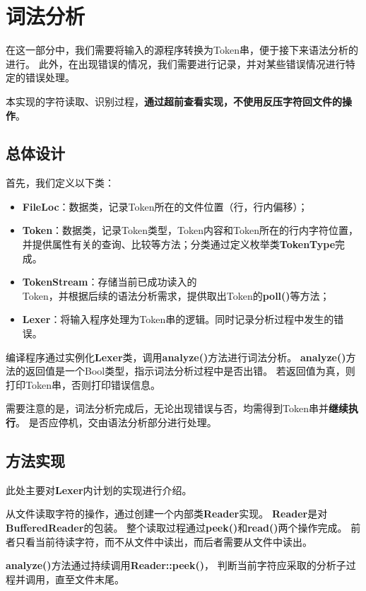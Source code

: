 \section{词法分析}

在这一部分中，我们需要将输入的源程序转换为Token串，便于接下来语法分析的进行。
此外，在出现错误的情况，我们需要进行记录，并对某些错误情况进行特定的错误处理。

本实现的字符读取、识别过程，\textbf{通过超前查看实现，不使用反压字符回文件的操作}。

\subsection{总体设计}

首先，我们定义以下类：
\begin{itemize}
    \item \textbf{FileLoc}：数据类，记录Token所在的文件位置（行，行内偏移）；
    \item \textbf{Token}：数据类，记录Token类型，Token内容和Token所在的行内字符位置，并提供属性有关的查询、比较等方法；分类通过定义枚举类\textbf{TokenType}完成。
    \item \textbf{TokenStream}：存储当前已成功读入的\\Token，并根据后续的语法分析需求，提供取出Token的\textbf{poll()}等方法；
    \item \textbf{Lexer}：将输入程序处理为Token串的逻辑。同时记录分析过程中发生的错误。
\end{itemize}

编译程序通过实例化\textbf{Lexer}类，调用\textbf{analyze()}方法进行词法分析。
\textbf{analyze()}方法的返回值是一个Bool类型，指示词法分析过程中是否出错。
若返回值为真，则打印Token串，否则打印错误信息。

需要注意的是，词法分析完成后，无论出现错误与否，均需得到Token串并\textbf{继续执行}。
是否应停机，交由语法分析部分进行处理。

\subsection{方法实现}

此处主要对\textbf{Lexer}内计划的实现进行介绍。

从文件读取字符的操作，通过创建一个内部类\textbf{Reader}实现。
\textbf{Reader}是对\textbf{BufferedReader}的包装。
整个读取过程通过\textbf{peek()}和\textbf{read()}两个操作完成。
前者只看当前待读字符，而不从文件中读出，而后者需要从文件中读出。

\textbf{analyze()}方法通过持续调用\textbf{Reader::peek()}，
判断当前字符应采取的分析子过程并调用，直至文件末尾。

